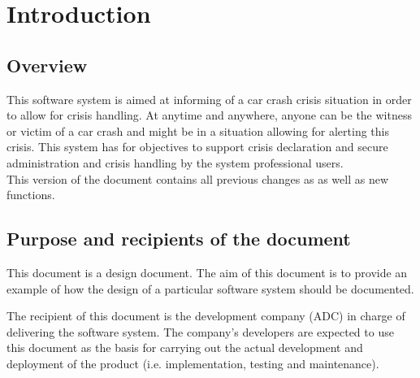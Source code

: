 \chapter{Introduction}
\label{chap:introduction}


\section{Overview}
This software system is aimed at informing of a car crash crisis situation in
order to allow for crisis handling. At anytime and anywhere, anyone can be the
witness or victim of a car crash and might be in a situation allowing for
alerting this crisis. This system has for objectives to support crisis
declaration and secure administration and crisis handling by the system
professional users.\\
This version of the document contains all previous changes as as well as new
functions.
\begin{comment}
:
\begin{itemize}
  \item Authentication (For authenticated users, after three failing
  connection tries a captcha test is proposed. A password reset is always
  possible)
  \item Information Diffusion(Some carefully selected information on
the crisis and alerts is available to the familly members for its diffusion)
  \item Time (Some timing statistics for all events/operations
are made available to the administrator in a abstract and detailed manner)
\end{itemize}

\end{comment}




\section{Purpose and recipients of the document}
This document is a design document. The aim of this document is to provide an
example of how the design of a particular software system should be documented. 

The recipient of this document is the development company (ADC) in charge
of delivering the software system. The company's developers are
expected to use this document as the basis for carrying out the actual
development and deployment of the product (i.e. implementation, testing
and maintenance).





